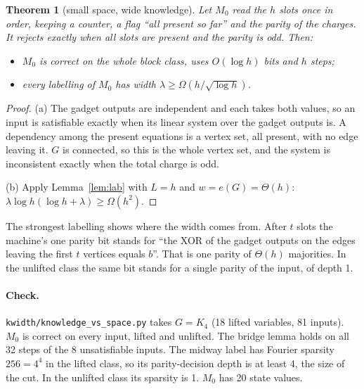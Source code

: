 \documentclass[11pt]{article}
\newtheorem{theorem}{Theorem}
\begin{document}
\begin{theorem}[small space, wide knowledge]\label{thm:sep}
Let $M_0$ read the $h$ slots once in order, keeping a counter, a flag ``all present so far'' and the parity of the charges. It rejects exactly when all slots are present and the parity is odd. Then:
\begin{itemize}
\item[(a)] $M_0$ is correct on the whole block class, uses $O(\log h)$ bits and $h$ steps;
\item[(b)] every labelling of $M_0$ has width $\lambda\ge\Omega(h/\sqrt{\log h})$.
\end{itemize}
\end{theorem}
\begin{proof}
(a) The gadget outputs are independent and each takes both values, so an input is satisfiable exactly when its linear system over the gadget outputs is. A dependency among the present equations is a vertex set, all present, with no edge leaving it. $G$ is connected, so this is the whole vertex set, and the system is inconsistent exactly when the total charge is odd.

(b) Apply Lemma~\ref{lem:lab} with $L=h$ and $w=e(G)=\Theta(h)$: $\lambda\log h(\log h+\lambda)\ge\Omega(h^2)$.
\end{proof}
The strongest labelling shows where the width comes from. After $t$ slots the machine's one parity bit stands for ``the XOR of the gadget outputs on the edges leaving the first $t$ vertices equals $b$''. That is one parity of $\Theta(h)$ majorities. In the unlifted class the same bit stands for a single parity of the input, of depth 1.

\paragraph{Check.} \texttt{kwidth/knowledge\_vs\_space.py} takes $G=K_4$ (18 lifted variables, 81 inputs). $M_0$ is correct on every input, lifted and unlifted. The bridge lemma holds on all 32 steps of the 8 unsatisfiable inputs. The midway label has Fourier sparsity $256=4^4$ in the lifted class, so its parity-decision depth is at least 4, the size of the cut. In the unlifted class its sparsity is 1. $M_0$ has 20 state values.
\end{document}

